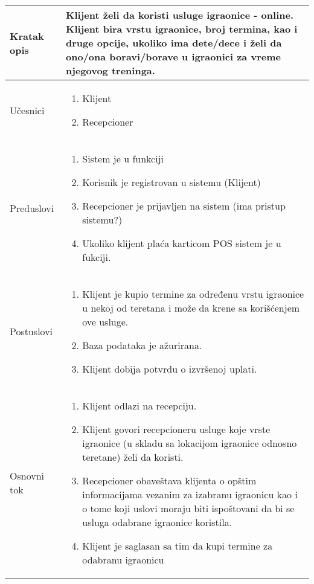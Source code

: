 \documentclass[../../main.tex]{subfiles}
\begin{document}
\begin{longtable}{| p{} | p{} |} 
\hline
    Kratak opis & Klijent želi da koristi usluge igraonice - online. Klijent bira vrstu igraonice, broj termina, kao i druge opcije, ukoliko ima dete/dece i želi da ono/ona boravi/borave u igraonici za vreme njegovog treninga.  \\ 
\hline
    Učesnici &
    \begin{enumerate}
        \item Klijent
        \item Recepcioner
    \end{enumerate}\\
\hline
   Preduslovi &
    \begin{enumerate}
        \item Sistem je u funkciji
        \item Korisnik je registrovan u sistemu (Klijent)
        \item Recepcioner je prijavljen na sistem (ima pristup sistemu?)
        \item Ukoliko klijent plaća karticom POS sistem je u fukciji.
    \end{enumerate}\\
\hline  
    Postuslovi & 
    \begin{enumerate}
         \item Klijent je kupio termine za određenu vrstu igraonice u nekoj od teretana i može da krene sa korišćenjem ove usluge.
         \item Baza podataka je ažurirana.
         \item Klijent dobija potvrdu o izvršenoj uplati.
    \end{enumerate} \\
\hline
    Osnovni tok & 
    \begin{enumerate}
        \item Klijent odlazi na recepciju.
        \item Klijent govori recepcioneru usluge koje vrste igraonice (u skladu sa lokacijom igraonice odnosno teretane) želi da koristi.
        \item Recepcioner obaveštava klijenta o opštim informacijama vezanim za izabranu igraonicu kao i o tome koji uslovi moraju biti ispoštovani da bi se usluga odabrane igraonice koristila.
        \item Klijent je saglasan sa tim da kupi termine za odabranu igraonicu

\end{enumerate}
\end{longtable}
\end{document}
